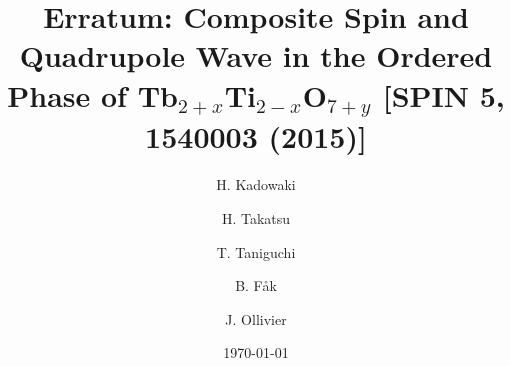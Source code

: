 \documentclass[%
 reprint,
 amsmath,amssymb,
 aps,
]{revtex4-2}
\begin{document}
\title{
Erratum: 
Composite Spin and Quadrupole Wave in the Ordered Phase of Tb$_{2+x}$Ti$_{2-x}$O$_{7+y}$ 
[SPIN 5, 1540003 (2015)]
}

\author{H. Kadowaki}%
\address{Department of Physics, Tokyo Metropolitan University, 
Hachioji-shi, Tokyo 192-0397, Japan}

\author{H. Takatsu}%
\address{Department of Physics, Tokyo Metropolitan University, 
Hachioji-shi, Tokyo 192-0397, Japan}

\author{T. Taniguchi}%
\address{Department of Physics, Tokyo Metropolitan University, 
Hachioji-shi, Tokyo 192-0397, Japan}

\author{B. F{\aa}k}%
\address{Institute Laue Langevin, BP156, F-38042 Grenoble, France}

\author{J. Ollivier}%
\address{Institute Laue Langevin, BP156, F-38042 Grenoble, France}

\date{\today}


\maketitle
\end{document}
